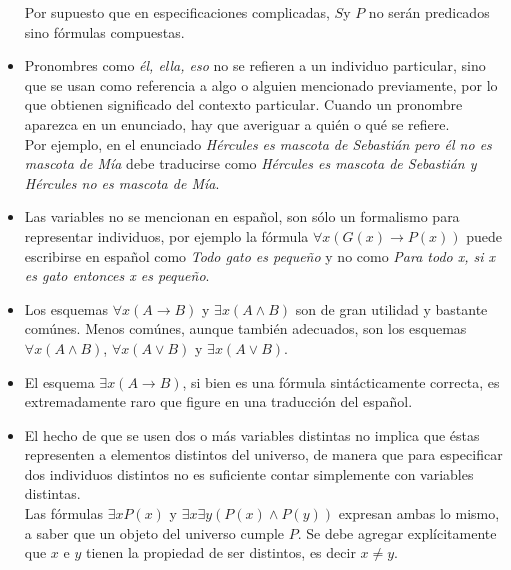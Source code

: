 \documentclass[letterpaper,12pt]{article}
\begin{document}
\begin{itemize}
      Por supuesto que en especificaciones complicadas, $S$y $P$ no serán 
      predicados sino fórmulas compuestas.

      \item Pronombres como \textit{él, ella, eso} no se refieren a un 
      individuo particular, sino que se usan como referencia a algo o alguien
      mencionado previamente, por lo que obtienen significado del contexto
      particular. Cuando un pronombre aparezca en un enunciado, hay que 
      averiguar a quién o qué se refiere. \\
      Por ejemplo, en el enunciado \textit{Hércules es mascota de Sebastián
      pero él no es mascota de Mía} debe traducirse como \textit{Hércules es
      mascota de Sebastián y Hércules no es mascota de Mía}.
      \item Las variables no se mencionan en español, son sólo un formalismo
      para representar individuos, por ejemplo la fórmula 
      $\forall x(G(x) \rightarrow P(x))$ puede escribirse  en español como 
      \textit{Todo gato es pequeño} y no como \textit{Para todo x, si x es 
      gato entonces x es pequeño}. 
      \item Los esquemas $\forall x (A \rightarrow B)$ y $\exists x (A \land B)$
      son de gran utilidad y bastante comúnes. Menos comúnes, aunque también 
      adecuados, son los esquemas $\forall x (A \land B)$, $\forall x (A \lor B)$
      y $\exists x (A \lor B)$.
      \item El esquema $\exists x (A \rightarrow B)$, si bien es una fórmula 
      sintácticamente correcta, es extremadamente raro que figure en una 
      traducción del español.
      \item El hecho de que se usen dos o más variables distintas no implica que
      éstas representen a elementos distintos del universo, de manera que para 
      especificar dos individuos distintos no es suficiente contar simplemente 
      con variables distintas. \\
      Las fórmulas $\exists x P(x)$ y $\exists x \exists y(P(x) \land P(y))$
      expresan ambas lo mismo, a saber que un objeto del universo cumple $P$.
      Se debe agregar explícitamente que $x$ e $y$ tienen la propiedad de ser 
      distintos, es decir $x \neq y$.
    \end{itemize}
\end{document}
